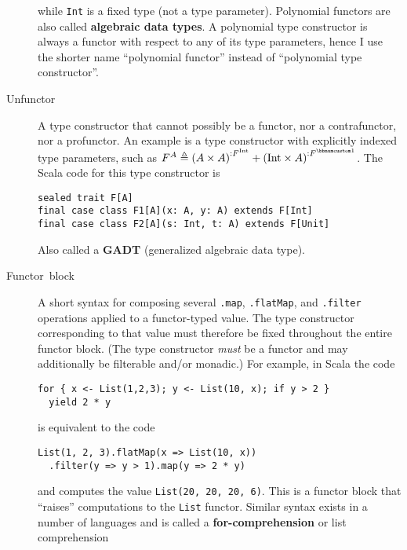 \begin{description}
while \lstinline!Int! is
a fixed type (not a type parameter). Polynomial functors are also
called \textbf{algebraic data types}.
A polynomial type constructor is always a functor with respect to
any of its type parameters, hence I use the shorter name ``polynomial
functor'' instead of ``polynomial type constructor''.
\item [{\index{unfunctor}Unfunctor}] A type constructor that cannot possibly
be a functor, nor a contrafunctor, nor a profunctor. An example is
a type constructor with explicitly indexed type parameters, such as
$F^{A}\triangleq\left(A\times A\right)^{:F^{\text{Int}}}+\left(\text{Int}\times A\right)^{:F^{\bbnum 1}}$.
The Scala code for this type constructor is
\begin{lstlisting}
sealed trait F[A]
final case class F1[A](x: A, y: A) extends F[Int]
final case class F2[A](s: Int, t: A) extends F[Unit]
\end{lstlisting}
Also called a \textbf{GADT}
(generalized algebraic data type).
\item [{\index{functor block}Functor~block}] A short syntax for composing
several \lstinline!.map!,
\lstinline!.flatMap!, and
\lstinline!.filter! operations
applied to a functor-typed value. The type constructor corresponding
to that value must therefore be fixed throughout the entire functor
block. (The type constructor \emph{must} be a functor and may additionally
be filterable and/or monadic.) For example, in Scala the code
\begin{lstlisting}
for { x <- List(1,2,3); y <- List(10, x); if y > 2 }
  yield 2 * y
\end{lstlisting}
is equivalent to the code
\begin{lstlisting}
List(1, 2, 3).flatMap(x => List(10, x))
  .filter(y => y > 1).map(y => 2 * y)
\end{lstlisting}
and computes the value \lstinline!List(20, 20, 20, 6)!.
This is a functor block that ``raises'' computations to the \lstinline!List!
functor. Similar syntax exists in a number of languages and is called
a \textbf{for-comprehension} or list comprehension

\end{description}
